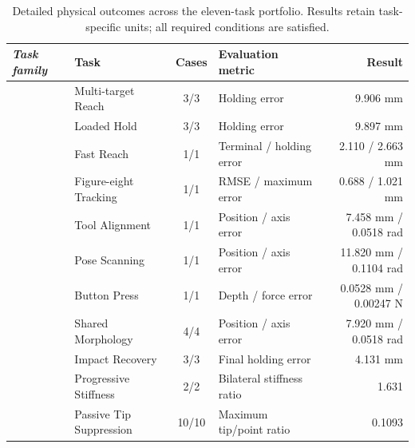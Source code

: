 \begin{table}[!t]
\centering
\caption{Detailed physical outcomes across the eleven-task portfolio. Results retain task-specific units; all required conditions are satisfied.}
\label{tab:physical-portfolio}
\papertablestyle
\begin{tabularx}{\textwidth}{@{}>{\itshape}p{}!{\color{TraceGray}\vrule width 0.25pt} X c p{0.235\textwidth} r@{}}
\toprule
\normalfont\textbf{Task family} & \normalfont\textbf{Task} & \textbf{Cases} & \textbf{Evaluation metric} & \textbf{Result} \\
\midrule
{}
& Multi-target Reach & 3/3 & Holding error & 9.906 mm \\
& Loaded Hold & 3/3 & Holding error & 9.897 mm \\
& Fast Reach & 1/1 & Terminal / holding error & 2.110 / 2.663 mm \\
& Figure-eight Tracking & 1/1 & RMSE / maximum error & 0.688 / 1.021 mm \\
\midrule
{}
& Tool Alignment & 1/1 & Position / axis error & 7.458 mm / 0.0518 rad \\
& Pose Scanning & 1/1 & Position / axis error & 11.820 mm / 0.1104 rad \\
& Button Press & 1/1 & Depth / force error & 0.0528 mm / 0.00247 N \\
\midrule
{}
& Shared Morphology & 4/4 & Position / axis error & 7.920 mm / 0.0518 rad \\
& Impact Recovery & 3/3 & Final holding error & 4.131 mm \\
\midrule
{}
& Progressive Stiffness & 2/2 & Bilateral stiffness ratio & 1.631 \\
& Passive Tip Suppression & 10/10 & Maximum tip/point ratio & 0.1093 \\
\bottomrule
\end{tabularx}
\end{table}
